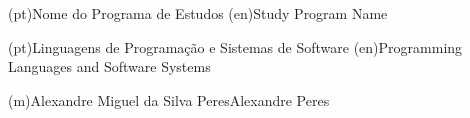 \ntdegreename*(pt){Nome do Programa de Estudos}
\ntdegreename*(en){Study Program Name}



\ntspecialization*(pt){Linguagens de Programação e Sistemas de Software}
\ntspecialization*(en){Programming Languages and Software Systems}







\ntauthorname(m){Alexandre Miguel da Silva Peres}{Alexandre Peres}



